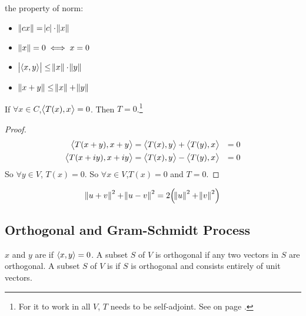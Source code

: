 \begin{theorem}
	the property of norm:
	\begin{itemize}
		\item $\norm{cx} = \abs{c} \cdot \norm{x}$
		\item $\norm{x} = 0 \iff x = 0$
		\item {} $\absolutevalue{\innerproduct{x}{y}} \leq \norm{x} \cdot \norm{y}$
		\item {} $\norm{x+y} \leq \norm{x} + \norm{y}$
	\end{itemize}
\end{theorem}

\begin{theorem}\label{zerotforalltx}
    If $\forall x \in C$,$\innerproduct{T(x)}{x} = 0$. Then $T = 0$.\footnote{For it to work in all $V$, $T$ needs to be self-adjoint. See  on page \pageref{zerotforalltxforselfadjoint}.}
\end{theorem}
\begin{proof}
    \begin{equation*}
        \begin{aligned}
            \innerproduct{T(x+y)}{x+y} &= \innerproduct{T(x)}{y} + \innerproduct{T(y)}{x}  &= 0 \\
            \innerproduct{T(x+iy)}{x+iy} &= \innerproduct{T(x)}{y} -\innerproduct{T(y)}{x} &= 0            
        \end{aligned}
    \end{equation*}
    So $\forall y \in V$, $T(x) = 0$. So $\forall x \in V$,$T(x) = 0$ and $T = 0$.
\end{proof}

\begin{theorem}
    \begin{equation}
        \norm{u+v}^2 + \norm{u-v}^2 = 2 \mleft(\norm{u}^2 + \norm{v}^2 \mright)
    \end{equation}    
\end{theorem}





\subsection{Orthogonal and Gram-Schmidt Process}

\begin{definition}
	$x$ and $y$ are  if $\innerproduct{x}{y} = 0$. A subset $S$ of $V$ is orthogonal if any two vectors in $S$ are orthogonal. A subset $S$ of $V$ is  if $S$ is orthogonal and consists entirely of unit vectors.
\end{definition}

